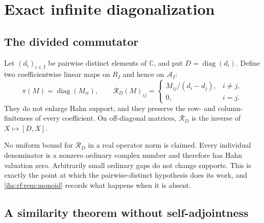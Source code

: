 \documentclass[11pt,a4paper]{article}
\numberwithin{equation}{section}
\theoremstyle{definition}
\theoremstyle{remark}
\newcommand{\C}{\mathbb C}
\newcommand{\Arf}{\mathcal A_I}
\newcommand{\diag}{\operatorname{diag}}
\begin{document}
\section{Exact infinite diagonalization}\label{ihs:sec:diagonal}

\subsection{The divided commutator}\label{ihs:rf:sec:divided}
Let $(d_i)_{i\in I}$ be pairwise distinct elements of $\C$, and put
$D=\diag(d_i)$. Define two coefficientwise linear maps on $R_I$ and hence on
$\Arf$:
\begin{equation}\label{ihs:rf:eq:maps}
 \pi(M)=\diag(M_{ii}),\qquad
 \mathcal R_D(M)_{ij}=
 \begin{cases}
 M_{ij}/(d_i-d_j),&i\ne j,\\
 0,&i=j.
 \end{cases}
\end{equation}
They do not enlarge Hahn support, and they preserve the row- and column-finiteness of
every coefficient. On off-diagonal matrices, $\mathcal R_D$ is the inverse
of $X\mapsto[D,X]$.

No uniform bound for $\mathcal R_D$ in a real operator norm is claimed.
Every individual denominator is a nonzero ordinary complex number and
therefore has Hahn valuation zero. Arbitrarily small ordinary gaps do not
change supports. This is exactly the point at which the pairwise-distinct
hypothesis does its work, and \cref{ihs:rf:rem:monoid} records what happens
when it is absent.

\subsection{A similarity theorem without self-adjointness}\label{ihs:rf:sec:similarity}
\end{document}
